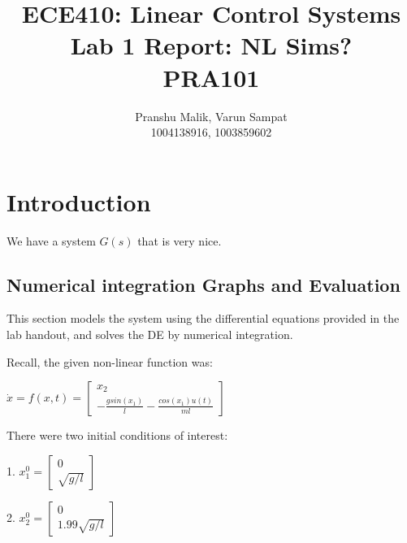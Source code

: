 \documentclass[10pt]{article}
\date{}
\begin{document}
\title{\textbf{\Large{\textsc{ECE410:} Linear Control Systems}} \\ \Large{Lab 1 Report: NL Sims?} \\ \textbf{\small{PRA101}}\vspace{-0.3cm}}
\author{Pranshu Malik, Varun Sampat \\ \footnotesize{1004138916}, \footnotesize{1003859602}\vspace{-3cm}}

\maketitle

\section{Introduction}
We have a system $G(s)$ that is very nice.


\subsection{Numerical integration Graphs and Evaluation}
This section models the system using the differential equations provided in the lab handout, and solves the DE by numerical integration. 

Recall, the given non-linear function was:
\begin{center}
   \begin{math}
    \dot{x} = f(x, t) = 
        \begin{bmatrix}
        x_2\\
        -\frac{g sin(x_1)}{l} - \frac{cos(x_1) u(t)}{ml}
        \end{bmatrix}
    \end{math} 
\end{center}

There were two initial conditions of interest:
\begin{center}
    1.
    \begin{math}
     x^0_1 = 
     \begin{bmatrix}
     0\\ \sqrt{g/l}
     \end{bmatrix}
    \end{math}
\end{center}

\begin{center}
    2. 
    \begin{math}
     x^0_2 = 
     \begin{bmatrix}
     0\\1.99 \sqrt{g/l}
     \end{bmatrix}
    \end{math}
\end{center}
\end{document}
